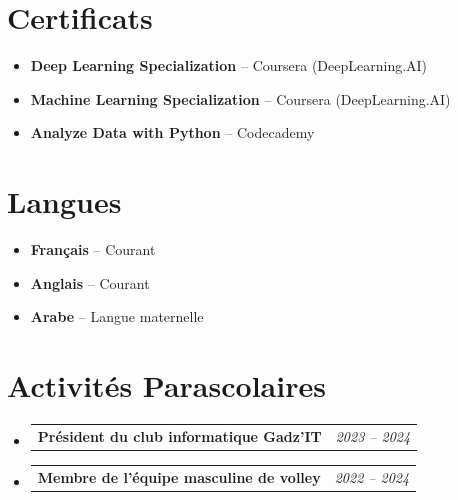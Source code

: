 \documentclass[a4paper,11pt]{article}
\makeatletter
\newcommand{\resumeItem}[2]{
  \item{
    \textbf{#1}{\hspace{0.5mm}#2 \vspace{-0.5mm}}
  }
}
\newcommand{\resumePOR}[3]{
\vspace{0.5mm}\item
    \begin{tabular*}{0.97\textwidth}[t]{l@{\extracolsep{\fill}}r}
        \textbf{#1}\hspace{0.3mm}#2 & \textit{\small{#3}} 
    \end{tabular*}
    \vspace{-2mm}
}
\newcommand{\resumeSubItem}[2]{\resumeItem{#1}{#2}\vspace{-4pt}}
\newcommand{\resumeSubHeadingListStart}{\begin{itemize}[leftmargin=*,labelsep=0mm]}
\newcommand{\resumeSubHeadingListEnd}{\end{itemize}\vspace{2mm}}
\makeatother
\begin{document}
\section{\textbf{Certificats}}
\resumeSubHeadingListStart
  \resumeSubItem{Deep Learning Specialization}{ – Coursera (DeepLearning.AI)}
  \resumeSubItem{Machine Learning Specialization}{ – Coursera (DeepLearning.AI)}
  \resumeSubItem{Analyze Data with Python}{ – Codecademy}
\resumeSubHeadingListEnd
\vspace{-5mm}

\section{\textbf{Langues}}
\resumeSubHeadingListStart
  \resumeSubItem{Français}{ – Courant}
  \resumeSubItem{Anglais}{ – Courant}
  \resumeSubItem{Arabe}{ – Langue maternelle}
\resumeSubHeadingListEnd
\vspace{-5mm}

\section{\textbf{Activités Parascolaires}}
\resumeSubHeadingListStart
  \resumePOR{Président du club informatique Gadz’IT}{}{2023 – 2024}
  \resumePOR{Membre de l’équipe masculine de volley}{}{2022 – 2024}
\resumeSubHeadingListEnd
\vspace{-5mm}
\end{document}
